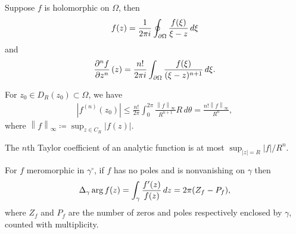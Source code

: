 \begin{theorem}\label{CauchyIntegral}

Suppose \(f\) is holomorphic on \(\Omega\), then
\begin{align*}
f(z) = {1 \over 2\pi i} \oint_{{{\partial}}\Omega} {f(\xi) \over \xi-z}\,d\xi
\end{align*}
and
\begin{align*}
{\frac{\partial ^nf }{\partial z^n}\,}(z) = {n! \over 2\pi i} \int_{{{\partial}}\Omega} {f(\xi) \over (\xi - z)^{n+1}} \,d\xi
.\end{align*}

\end{theorem}

\begin{theorem}\label{CauchyInequality}

For \(z_0 \in D_R(z_0) \subset \Omega\), we have
\begin{align*}
{\left\lvert { f^{(n)} (z_0) } \right\rvert} 
\leq \frac{n !}{2 \pi} \int_{0}^{2 \pi} \frac{ {\left\lVert {f} \right\rVert}_{\infty} } {R^{n+1}} R \,d\theta
= \frac{n !{\left\lVert {f} \right\rVert}_{\infty}}{R^n} 
,\end{align*}
where
\({\left\lVert {f} \right\rVert}_{\infty}\coloneqq\sup_{z\in C_R} {\left\lvert {f(z)} \right\rvert}\).

\begin{slogan}

The \(n\)th Taylor coefficient of an analytic function is at most
\(\sup_{{\left\lvert {z} \right\rvert} = R} {\left\lvert {f} \right\rvert}/R^n\).

\end{slogan}

\end{theorem}

\begin{theorem}

For \(f\) meromorphic in \(\gamma^\circ\), if \(f\) has no poles and is
nonvanishing on \(\gamma\) then
\begin{align*}  
\Delta_\gamma \arg f(z) = \int_\gamma {f'(z) \over f(z)} \,dz = 2\pi (Z_f - P_f)
,\end{align*}
where \(Z_f\) and \(P_f\) are the number of zeros and poles respectively
enclosed by \(\gamma\), counted with multiplicity.

\end{theorem}

